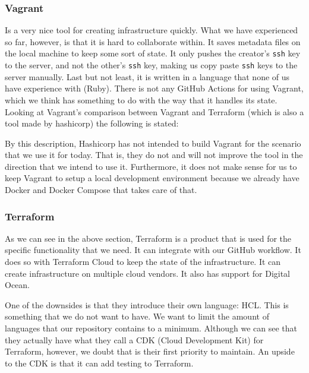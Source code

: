 \subsubsection{Vagrant}

Is a very nice tool for creating infrastructure quickly. What we have experienced so far, however, is that it is hard to collaborate within. It saves metadata files on the local machine to keep some sort of state. It only pushes the creator's \texttt{ssh} key to the server, and not the other's \texttt{ssh} key, making us copy paste \texttt{ssh} keys to the server manually. Last but not least, it is written in a language that none of us have experience with (Ruby).
There is not any GitHub Actions for using Vagrant, which we think has something to do with the way that it handles its state. Looking at Vagrant's comparison between Vagrant and Terraform (which is also a tool made by hashicorp) the following is stated:



By this description, Hashicorp has not intended to build Vagrant for the scenario that we use it for today. That is, they do not and will not improve the tool in the direction that we intend to use it. Furthermore, it does not make sense for us to keep Vagrant to setup a local development environment because we already have Docker and Docker Compose that takes care of that.

\subsubsection{Terraform}

As we can see in the above section, Terraform is a product that is used for the specific functionality that we need. It can integrate with our GitHub workflow. It does so with Terraform Cloud to keep the state of the infrastructure. It can create infrastructure on multiple cloud vendors. It also has support for Digital Ocean.

One of the downsides is that they introduce their own language: HCL. This is something that we do not want to have. We want to limit the amount of languages that our repository contains to a minimum. Although we can see that they actually have what they call a CDK (Cloud Development Kit) for Terraform, however, we doubt that is their first priority to maintain. An upside to the CDK is that it can add testing to Terraform.

